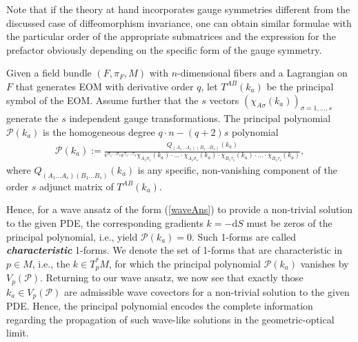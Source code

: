 Note that if the theory at hand incorporates gauge symmetries different from the discussed case of diffeomorphism invariance, one can obtain similar formulae with the particular order of the appropriate submatrices and the expression for the prefactor obviously depending on the specific form of the gauge symmetry.
\begin{definition}
Given a field bundle $(F,\pi_F,M)$ with $n$-dimensional fibers and a Lagrangian on $F$ that generates EOM with derivative order $q$, let  $T^{AB}(k_a)$ be the principal symbol of the EOM. Assume further that the $s$ vectors $(\chi_{A\sigma}(k_a))_{\sigma=1,...,s}$ generate the $s$ independent gauge transformations. The principal polynomial $\mathcal{P}(k_a)$
is the homogeneous degree $q\cdot n - (q+2)s$ polynomial
\begin{align}
\mathcal{P}(k_a) := \frac{Q_{(A_1...A_s)(B_1...B_s)}(k_a)}{\epsilon^{\sigma_1...\sigma_s} \epsilon^{\tau_1...\tau_s} \chi_{A_1\sigma_1}(k_a)\cdot ... \cdot \chi_{A_s\sigma_s}(k_a) \cdot \chi_{B_1\tau_1}(k_a) \cdot ... \cdot \chi_{B_s\tau_s}(k_a)},
\end{align}
where $Q_{(A_1...A_s)(B_1...B_s)}(k_a)$ is any specific, non-vanishing component of the order $s$ adjunct matrix of $T^{AB}(k_a)$.
\end{definition}
Hence, for a wave ansatz of the form (\ref{waveAns}) to provide a non-trivial solution to the given PDE, the corresponding gradients $k = - \mathrm{d}S$ must be zeros of the principal polynomial, i.e., yield $\mathcal{P}(k_a) = 0$.
Such 1-forms are called \textit{\textbf{characteristic}} 1-forms. We denote the set of 1-forms that are characteristic in $p \in M$, i.e., the $k \in T_p^{\ast}M$, for which the principal  polynomial $\mathcal{P}(k_a)$ vanishes by $V_p(\mathcal{P})$. Returning to our wave ansatz, we now see that exactly those $k_a \in V_p(\mathcal{P})$ are admissible wave covectors for a non-trivial solution to the given PDE. Hence, the principal polynomial encodes the complete information regarding the propagation of such wave-like solutions in the geometric-optical limit.

